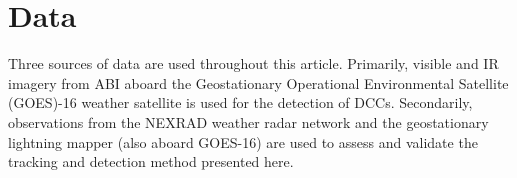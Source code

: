 


\section{Data}

Three sources of data are used throughout this article.
Primarily, visible and IR imagery from ABI aboard the Geostationary Operational Environmental Satellite (GOES)-16 weather satellite is used for the detection of DCCs.
Secondarily, observations from the NEXRAD weather radar network and the geostationary lightning mapper (also aboard GOES-16) are used to assess and validate the tracking and detection method presented here.

